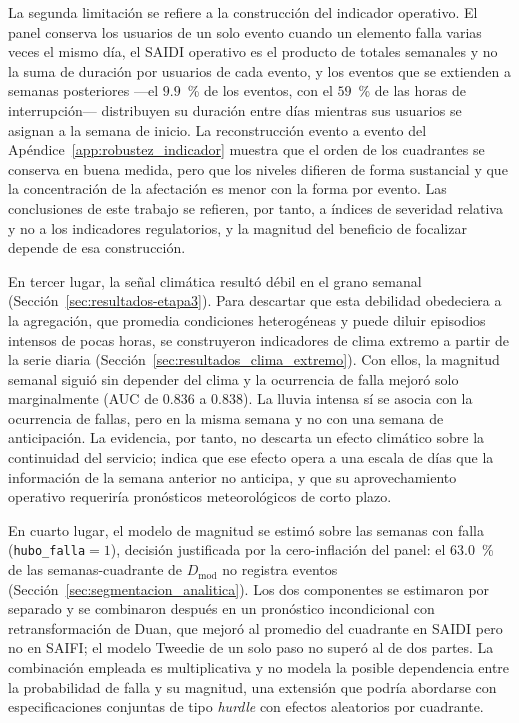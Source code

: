 La segunda limitación se refiere a la construcción del indicador operativo. El panel conserva los usuarios de un solo evento cuando un elemento falla varias veces el mismo día, el SAIDI operativo es el producto de totales semanales y no la suma de duración por usuarios de cada evento, y los eventos que se extienden a semanas posteriores ---el $9{.}9$~\% de los eventos, con el $59$~\% de las horas de interrupción--- distribuyen su duración entre días mientras sus usuarios se asignan a la semana de inicio. La reconstrucción evento a evento del Apéndice~\ref{app:robustez_indicador} muestra que el orden de los cuadrantes se conserva en buena medida, pero que los niveles difieren de forma sustancial y que la concentración de la afectación es menor con la forma por evento. Las conclusiones de este trabajo se refieren, por tanto, a índices de severidad relativa y no a los indicadores regulatorios, y la magnitud del beneficio de focalizar depende de esa construcción.

En tercer lugar, la señal climática resultó débil en el grano semanal (Sección~\ref{sec:resultados-etapa3}). Para descartar que esta debilidad obedeciera a la agregación, que promedia condiciones heterogéneas y puede diluir episodios intensos de pocas horas, se construyeron indicadores de clima extremo a partir de la serie diaria (Sección~\ref{sec:resultados_clima_extremo}). Con ellos, la magnitud semanal siguió sin depender del clima y la ocurrencia de falla mejoró solo marginalmente (AUC de $0{.}836$ a $0{.}838$). La lluvia intensa sí se asocia con la ocurrencia de fallas, pero en la misma semana y no con una semana de anticipación. La evidencia, por tanto, no descarta un efecto climático sobre la continuidad del servicio; indica que ese efecto opera a una escala de días que la información de la semana anterior no anticipa, y que su aprovechamiento operativo requeriría pronósticos meteorológicos de corto plazo.

En cuarto lugar, el modelo de magnitud se estimó sobre las semanas con falla (\texttt{hubo\_falla}$=1$), decisión justificada por la cero-inflación del panel: el $63{.}0$~\% de las semanas-cuadrante de $D_{\mathrm{mod}}$ no registra eventos (Sección~\ref{sec:segmentacion_analitica}). Los dos componentes se estimaron por separado y se combinaron después en un pronóstico incondicional con retransformación de Duan, que mejoró al promedio del cuadrante en SAIDI pero no en SAIFI; el modelo Tweedie de un solo paso no superó al de dos partes. La combinación empleada es multiplicativa y no modela la posible dependencia entre la probabilidad de falla y su magnitud, una extensión que podría abordarse con especificaciones conjuntas de tipo \emph{hurdle} con efectos aleatorios por cuadrante.

